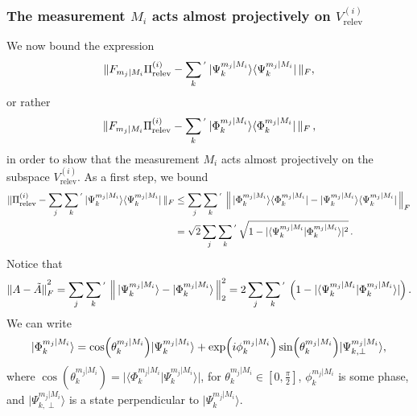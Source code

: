 \subsubsection{The measurement $M_i$ acts almost projectively on $V_{\text{relev}}^{(i)}$}
We now bound the expression
\begin{equation}
\label{eqn:projectiveness}
\|F_{m_j\vert M_i}\Pi_{\text{relev}}^{(i)}-\sum_{k}{}^{'}\thinspace\vert \Psi_k^{m_j\vert M_i}\rangle \langle \Psi_k^{m_j\vert M_i}\vert \thinspace \|_F,
\end{equation}
or rather
\begin{equation*}
\|F_{m_j\vert M_i}\Pi_{\text{relev}}^{(i)}-\sum_{k}{}^{'}\thinspace\vert \Phi_k^{m_j\vert M_i}\rangle \langle \Phi_k^{m_j\vert M_i}\vert \thinspace\|_F\thinspace,
\end{equation*}
in order to show that the measurement $M_i$ acts almost projectively on the subspace $V_{\text{relev}}^{(i)}$. As a first step, we bound
\begin{equation}
\label{eqn:bound1}
\begin{split}
\|\Pi_{\text{relev}}^{(i)}-\sum_j\sum_k{}^{'}\thinspace\vert \Psi_k^{m_j\vert M_i}\rangle \langle \Psi_k^{m_j\vert M_i}\vert \thinspace\|_F & \leq \sum_j\sum_k{}^{'}\thinspace\left\| \thinspace \vert \Phi_k^{m_j\vert M_i}\rangle \langle \Phi_k^{m_j\vert M_i}\vert-\vert \Psi_k^{m_j\vert M_i}\rangle \langle \Psi_k^{m_j\vert M_i}\vert\thinspace\right\|_F \\
& =\sqrt{2}\sum_j\sum_k{}^{'}\thinspace\sqrt{1-\vert \langle \Psi_k^{m_j\vert M_i} \vert \Phi_k^{m_j\vert M_i} \rangle \vert^2}\thinspace.
\end{split}
\end{equation}
Notice that
\begin{equation}
\label{eqn:bound2}
\|A-\Tilde{A}\|_F^{\textstyle ^2}=\sum_j\sum_k{}^{'}\thinspace\left\|\thinspace\vert \Psi_k^{m_j\vert M_i} \rangle - \vert \Phi_k^{m_j\vert M_i}\rangle\thinspace\right\|_2^2=2\sum_j\sum_k{}^{'}\thinspace\left(1-\vert\langle \Psi_k^{m_j\vert M_i} \vert \Phi_k^{m_j\vert M_i} \rangle \vert\right).
\end{equation}
We can write 
\begin{equation*}
\vert \Phi_k^{m_j\vert M_i}\rangle = \cos(\theta_k^{m_j\vert M_i})\vert \Psi_k^{m_j\vert M_i}\rangle + \exp(i\phi_k^{m_j\vert M_i})\sin(\theta_k^{m_j\vert M_i})\vert \Psi_{k,\perp}^{m_j\vert M_i} \rangle, \\[0.5em]
\end{equation*}
where $\cos(\theta_k^{m_j\vert M_i})= \vert\langle \Phi_k^{m_j\vert M_i}\vert\Psi_k^{m_j\vert M_i} \rangle\vert$, for $\theta_k^{m_j\vert M_i}\in[0,\frac{\pi}{2}]$, $\phi_k^{m_j\vert M_i}$ is some phase, and $\vert \Psi_{k,\perp}^{m_j\vert M_i} \rangle$ is a state perpendicular to $\vert \Psi_k^{m_j\vert M_i}\rangle$.
